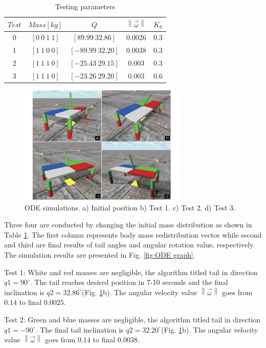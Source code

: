 \begin{table}
	\centering
\begin{tabular}{|c|c|c|c|c|}
	\hline
$Test$ &  $Mass[kg]$ & $Q$  & $\left \| \vec{\omega} \right \|$ & $K_0$\\
	\hline
0   & $[0\: 0\: 1\: 1]$ & $[89.99\: 32.86]$ & 0.0026 & 0.3\\
1   & $[1\: 1\: 0\: 0]$ & $[-89.99\: 32.20]$ & 0.0038 & 0.3\\
2   & $[1\: 1\: 1\: 0]$ & $[-25.43\: 29.15]$ &  0.003 & 0.3\\
3   & $[1\: 1\: 1\: 0]$ & $[-23.26\: 29.20]$ &  0.003 & 0.6\\
\hline
\end{tabular}
\caption{Testing parameters}\label{tab:Simulations}
\end{table}



\begin{figure}
	\centering
	\includegraphics[width=80mm]{./pictures/ODE_simulations.pdf}
	\caption{ODE simulations. a) Initial position b) Test 1. c) Test 2. d) Test 3.}
	\label{fig:ODESimulations}
\end{figure}

Three four are conducted by changing the initial mass distribution as shown in Table \ref{tab:Simulations}. The first column represents body mass redistribution vector while second and third are final results of tail angles and angular rotation value, respectively. The simulation results are presented in Fig. \ref{fig:ODE graph}. 

Test 1: White and red masses are negligible, the algorithm titled tail in direction $q1=90^{\circ}$. The tail reaches desired position in 7-10 seconds and the final inclination is $q2=32.86^{\circ}$(Fig. \ref{fig:ODESimulations}b). The angular velocity value $\left \| \vec{\omega} \right \|$ goes from $0.14$ to final $0.0025$.

Test 2: Green and blue masses are negligible, the algorithm titled tail in direction $q1=-90^{\circ}$. The final tail inclination is $q2=32.20^{\circ}$(Fig. \ref{fig:ODESimulations}b). The angular velocity value $\left \| \vec{\omega} \right \|$ goes from $0.14$ to final $0.0038$. 

